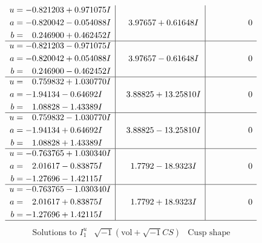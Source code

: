 \documentclass[1p]{elsarticle_modified}
\theoremstyle{definition}
\newcommand{\I}{\sqrt{-1}}
\begin{document}
$$\begin{array}{c|c|c}
\begin{aligned}
u &= -0.821203 + 0.971075 I \\
a &= -0.820042 - 0.054088 I \\
b &= \phantom{-}0.246900 + 0.462452 I\end{aligned}
 & \phantom{-}3.97657 + 0.61648 I & \phantom{-0.000000 } 0 \\ \hline\begin{aligned}
u &= -0.821203 - 0.971075 I \\
a &= -0.820042 + 0.054088 I \\
b &= \phantom{-}0.246900 - 0.462452 I\end{aligned}
 & \phantom{-}3.97657 - 0.61648 I & \phantom{-0.000000 } 0 \\ \hline\begin{aligned}
u &= \phantom{-}0.759832 + 1.030770 I \\
a &= -1.94134 - 0.64692 I \\
b &= \phantom{-}1.08828 - 1.43389 I\end{aligned}
 & \phantom{-}3.88825 + 13.25810 I & \phantom{-0.000000 } 0 \\ \hline\begin{aligned}
u &= \phantom{-}0.759832 - 1.030770 I \\
a &= -1.94134 + 0.64692 I \\
b &= \phantom{-}1.08828 + 1.43389 I\end{aligned}
 & \phantom{-}3.88825 - 13.25810 I & \phantom{-0.000000 } 0 \\ \hline\begin{aligned}
u &= -0.763765 + 1.030340 I \\
a &= \phantom{-}2.01617 - 0.83875 I \\
b &= -1.27696 - 1.42115 I\end{aligned}
 & \phantom{-}1.7792 - 18.9323 I & \phantom{-0.000000 } 0 \\ \hline\begin{aligned}
u &= -0.763765 - 1.030340 I \\
a &= \phantom{-}2.01617 + 0.83875 I \\
b &= -1.27696 + 1.42115 I\end{aligned}
 & \phantom{-}1.7792 + 18.9323 I & \phantom{-0.000000 } 0\\
 \hline 
 \end{array}$$\newpage$$\begin{array}{c|c|c}  
\text{Solutions to }I^u_{1}& \I (\text{vol} + \sqrt{-1}CS) & \text{Cusp shape}\\
 \hline 
\begin{aligned}

\end{aligned}
\end{array}$$
\end{document}
